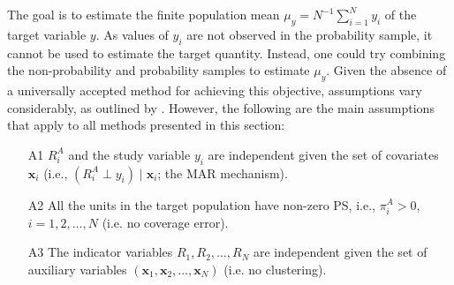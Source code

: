 \documentclass[
]{jss}
\begin{document}
\begin{table}[ht!]
    \centering
    \caption{Two-sample setting}
    \label{tab-two-sources}
\end{table}

The goal is to estimate the finite population mean
\(\mu_y=N^{-1}\sum_{i=1}^{N} y_{i}\) of the target variable \(y\). As
values of \(y_{i}\) are not observed in the probability sample, it
cannot be used to estimate the target quantity. Instead, one could try
combining the non-probability and probability samples to estimate
\(\mu_y\). Given the absence of a universally accepted method for
achieving this objective, assumptions vary considerably, as outlined by
\citet{wu2022statistical}. However, the following are the main
assumptions that apply to all methods presented in this section:

\begin{itemize}
\item[A1] $R_i^A$ and the study variable $y_i$ are independent given the set of covariates $\boldsymbol{x}_i$ (i.e., $\left(R_i^A \perp y_i\right) \mid \boldsymbol{x}_i$; the MAR mechanism).
\item[A2] All the units in the target population have non-zero PS, i.e., $\pi_i^A>0$, $i=1,2, \ldots, N$ (i.e. no coverage error).
\item[A3] The indicator variables $R_1, R_2, \ldots, R_N$ are independent given the set of auxiliary variables $\left(\boldsymbol{x}_1, \boldsymbol{x}_2, \ldots, \boldsymbol{x}_N\right)$ (i.e. no clustering).
\end{itemize}
\end{document}
